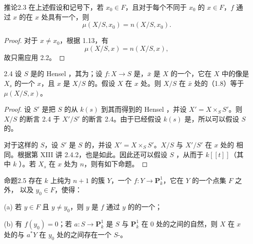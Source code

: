 \begin{SGAresult}{推论}{2.3}
在上述假设和记号下，若 $x_0\in F$，且对于每个不同于 $x_0$ 的 $x\in F$，$f$ 通过 $x$ 的在 $x$ 处具有一个，则
\[
\mu(X/S,x_0)=n(X/S,x_0).
\]
\end{SGAresult}
\begin{proof}
对于 $x\ne x_0$，根据 1.13，有
\[
\mu(X/S,x)=n(X/S,x),
\]
故只需应用 2.2。
\end{proof}

\begin{SGAresult}{}{2.4}
设 $S$ 是的 Hensel ，其为；设 $f:X\to S$ 是，$\bar x$ 是 $X$ 的一个，它在 $X$ 中的像是 $X_s$ 的一个 $x$，且 $x$ 是 $X/S$ 的。假设 $X$ 在 $x$ 处。则 $X/S$ 在 $\bar x$ 处的（1.8）等于  $\mu(X/S,x)$。
\end{SGAresult}
\begin{proof}
设 $S'$ 是把 $S$ 的从 $k(s)$ 到其而得到的 Hensel ，并设 $X'=X\times_S S'$。则 $X/S$ 的断言 2.4 于 $X'/S'$ 的断言 2.4。由于已经假设 $k(s)$ 是，所以可以假设 $S$ 的。

对于这样的 $S$，设 $S'$ 是 $S$ 的，并设 $X'=X\times_S S'$。$X/S$ 与 $X'/S'$ 在 $x$ 处的 相同。根据第 XIII 讲 2.4.2，也是如此。因此还可以假设 $S$ ，从而于 $k[[t]]$（其中 $k$ ）。若 $X_s$ 在 $x$ 处为 $n$，则有如下命题。
\end{proof}

\begin{SGAresult}{命题}{2.5}
存在 $k$ 上纯为 $n+1$ 的簇 $Y$，一个 $f:Y\to\mathbf P^1_k$，它在 $Y$ 的一个点集 $F$ 之外，
以及 $y_0\in F$，使得：

(a) 若 $y\in F$ 且 $y\ne y_0$，则 $y$ 是 $f$ 通过 $y$ 的的一个；

(b) 有 $f(y_0)=0$；若 $a:S\to\mathbf P^1_k$ 是 $S$ 与 $\mathbf P^1_k$ 在 $0$ 处的之间的自然，则 $X$ 在 $x$ 处的与 $a^*Y$ 在 $y_0$ 处的之间存在一个 $S$-。
\end{SGAresult}

